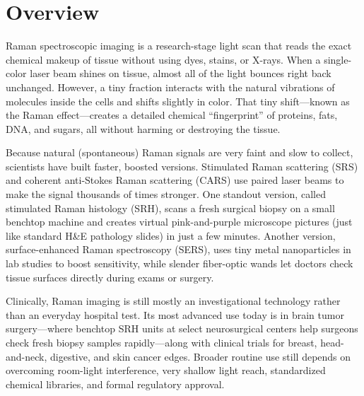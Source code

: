 \label{ch:infographic-raman}

\section{Overview}

Raman spectroscopic imaging is a research-stage light scan that reads the exact chemical makeup of tissue without using dyes, stains, or X-rays. When a single-color laser beam shines on tissue, almost all of the light bounces right back unchanged. However, a tiny fraction interacts with the natural vibrations of molecules inside the cells and shifts slightly in color. That tiny shift---known as the Raman effect---creates a detailed chemical ``fingerprint'' of proteins, fats, DNA, and sugars, all without harming or destroying the tissue.

Because natural (spontaneous) Raman signals are very faint and slow to collect, scientists have built faster, boosted versions. Stimulated Raman scattering (SRS) and coherent anti-Stokes Raman scattering (CARS) use paired laser beams to make the signal thousands of times stronger. One standout version, called stimulated Raman histology (SRH), scans a fresh surgical biopsy on a small benchtop machine and creates virtual pink-and-purple microscope pictures (just like standard H\&E pathology slides) in just a few minutes. Another version, surface-enhanced Raman spectroscopy (SERS), uses tiny metal nanoparticles in lab studies to boost sensitivity, while slender fiber-optic wands let doctors check tissue surfaces directly during exams or surgery.

Clinically, Raman imaging is still mostly an investigational technology rather than an everyday hospital test. Its most advanced use today is in brain tumor surgery---where benchtop SRH units at select neurosurgical centers help surgeons check fresh biopsy samples rapidly---along with clinical trials for breast, head-and-neck, digestive, and skin cancer edges. Broader routine use still depends on overcoming room-light interference, very shallow light reach, standardized chemical libraries, and formal regulatory approval.

